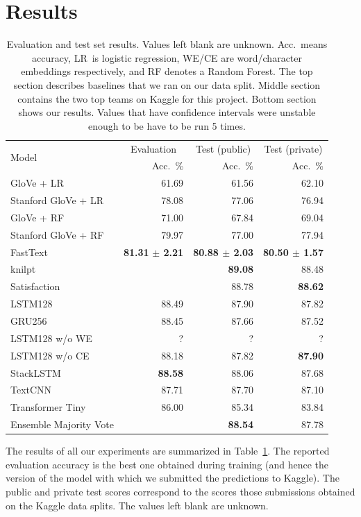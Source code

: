 \documentclass[10pt,conference,compsocconf]{IEEEtran}
\begin{document}
\section{Results}

\begin{table}\centering
\begin{tabular}{lrrr}
\toprule
\multirow{2}{*}{Model} & \multicolumn{1}{c}{Evaluation} & \multicolumn{1}{c}{Test (public)} & \multicolumn{1}{c}{Test (private)}\\
& Acc.~\% & Acc.~\% & Acc.~\%\\
\midrule
GloVe + LR & 61.69 & 61.56 & 62.10\\
Stanford GloVe + LR & 78.08 & 77.06 & 76.94\\
GloVe + RF & 71.00 & 67.84 & 69.04\\
Stanford GloVe + RF & 79.97 & 77.00 & 77.94\\
FastText \cite{joulin2017bag} & \textbf{81.31} \textbf{$\pm$ 2.21} & \textbf{80.88 $\pm$ 2.03}& \textbf{80.50 $\pm$ 1.57}\\
\midrule
knilpt &  & \textbf{89.08} & 88.48\\
Satisfaction &  & 88.78 & \textbf{88.62}\\
\midrule
LSTM128 & 88.49 & 87.90 & 87.82\\
GRU256 & 88.45 & 87.66 & 87.52\\
LSTM128 w/o WE & ? & ? & ?\\
LSTM128 w/o CE & 88.18 & 87.82 & \textbf{87.90}\\
StackLSTM & \textbf{88.58} & 88.06 & 87.68\\
TextCNN & 87.71 & 87.70 & 87.10\\
Transformer Tiny & 86.00 & 85.34 & 83.84\\
Ensemble Majority Vote & & \textbf{88.54} & 87.78\\
\bottomrule
\end{tabular}
\caption{Evaluation and test set results. Values left blank are unknown. Acc.~means accuracy, LR~is logistic regression, WE/CE are word/character embeddings respectively, and RF denotes a Random Forest. The top section describes baselines that we ran on our data split. Middle section contains the two top teams on Kaggle for this project. Bottom section shows our results. Values that have confidence intervals were unstable enough to be have to be run 5 times.}\label{tab:results}
\end{table}

The results of all our experiments are summarized in Table~\ref{tab:results}. The reported evaluation accuracy is the best one obtained during training (and hence the version of the model with which we submitted the predictions to Kaggle). The public and private test scores correspond to the scores those submissions obtained on the Kaggle data splits. The values left blank are unknown.
\end{document}
